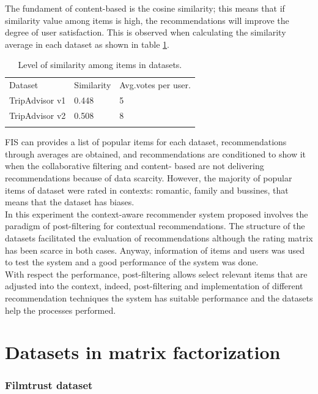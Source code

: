 The fundament of content-based is the cosine similarity; this means
that if similarity value among items is high, the recommendations will
improve the degree of user satisfaction. This is observed when
calculating the similarity average in each dataset as shown in table
\ref{tab:5}.
\begin{table}
	\centering
	\small
	\caption{Level of similarity among items in datasets. }
	\label{tab:5}      
	\begin{tabular}{lll}
		\hline\noalign{\smallskip}
		Dataset  & Similarity  & Avg.votes per user. \\
		\noalign{\smallskip}\hline\noalign{\smallskip}
		TripAdvisor v1 & 0.448  & 5  \\
		TripAdvisor v2 & 0.508  & 8  \\
		\noalign{\smallskip}\hline
	\end{tabular}
\end{table}

FIS can provides a list of popular items for each dataset,
recommendations through averages are obtained, and recommendations are
conditioned to show it when the collaborative filtering and content-
based are not delivering recommendations because of data scarcity.
However, the majority of popular items of dataset were rated in contexts: romantic, family and bussines, that means that the dataset has
biases.\\  In this experiment  the context-aware recommender system
proposed involves the paradigm of post-filtering for contextual
recommendations. The structure of the datasets facilitated the
evaluation of recommendations although the rating matrix has been
scarce in both cases. Anyway, information of items and users was used
to test the system and a good performance of the system was done.\\   With
respect the performance, post-filtering allows select relevant
items that are adjusted into the context, indeed, post-filtering and
implementation of different recommendation techniques the system has
suitable performance and the datasets help the processes performed.

\section{Datasets in matrix factorization}

\subsubsection{Filmtrust dataset} 

